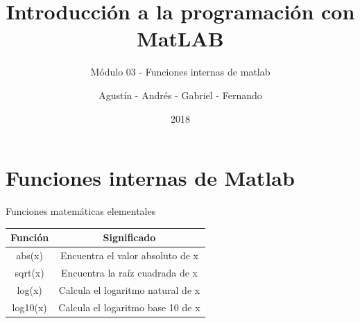 \documentclass{bredelebeamer}
\title[Programación en MatLAB]{Introducción a la programación con MatLAB}
\subtitle{Módulo 03 - Funciones internas de matlab}
\author{Agustín - Andrés - Gabriel - Fernando\inst{1}}
\institute[UTN.BA]
{
  \inst{1}%
  Universidad Tecnológica Nacional\\
  Facultad Regional Buenos Aires
  }
\date{2018}
\begin{document}
\begin{frame}
  \titlepage 
\end{frame}




\section{Funciones internas de Matlab}

\begin{frame}{Funciones matemáticas elementales}
\begin{table}[]
\centering
\begin{tabular}{|c|c|}
\hline
Función  & Significado                       \\ \hline
abs(x)   & Encuentra el valor absoluto de x  \\ \hline
sqrt(x)  & Encuentra la raíz cuadrada de x   \\ \hline
log(x)   & Calcula el logaritmo natural de x \\ \hline
log10(x) & Calcula el logaritmo base 10 de x \\ \hline
\end{tabular}
\end{table}
\end{frame}
\end{document}
